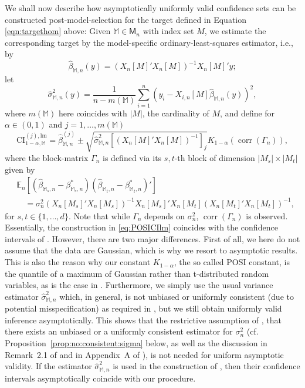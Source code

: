 \documentclass[preprint]{imsart}
\newcommand{\E}{{\mathbb E}}
\newcommand{\M}{\mathbb M}
\DeclareMathOperator{\corr}{corr}
\numberwithin{equation}{section}
\begin{document}
We shall now describe how asymptotically uniformly valid confidence sets can be constructed post-model-selection for the target defined in Equation \eqref{eqn:targethom} above: Given $\mathbb{M} \in \mathsf{M}_n$ with index set $M$, we estimate the corresponding target by the model-specific ordinary-least-squares estimator, i.e., by
%
\begin{equation}\label{eq:OLS}
\hat{\beta}_{\mathbb{M}, n}(y) = \left(X_n[M]'X_n[M]\right)^{-1} X_n[M]'y;
\end{equation}
%
let
%
\begin{equation*}
\hat{\sigma}^2_{\mathbb{M}, n}(y) = \frac{1}{n- m(\mathbb{M})} \sum_{i = 1}^n (y_i - X_{i,n}[M] \hat{\beta}_{\mathbb{M}, n}(y) )^2,
\end{equation*}
%
where $m(\mathbb{M})$ here coincides with $|M|$, the cardinality of $M$, and define for $\alpha \in (0, 1)$ and $j = 1, \hdots, m(\mathbb{M})$
%
\begin{equation}\label{eq:POSICIlm}
\mathrm{CI}_{1-\alpha, \mathbb{M}}^{(j), \mathrm{lm}} = \hat{\beta}^{(j)}_{\mathbb{M}, n} \pm  \sqrt{\hat{\sigma}^2_{\mathbb{M}, n} \left[\left( X_n[M]'X_n[M]  \right)^{-1}\right]_j} K_{1-\alpha}(\corr(\Gamma_n)), 
\end{equation}
%
where the block-matrix $\Gamma_n$ is defined via its $s,t$-th block of dimension $|M_s|\times|M_t|$ given by
%
\begin{align*}
&\E_n\left[ \left(\hat{\beta}_{\M_s,n} - \beta^*_{\M_s,n}\right) \left(\hat{\beta}_{\M_t,n} - \beta^*_{\M_t,n}\right)'  \right] \\
&\quad= \sigma_n^2\left( X_n[M_s]' X_n[M_s] \right)^{-1} X_n[M_s]' X_n[M_t] \left( X_n[M_t]' X_n[M_t] \right)^{-1}, 
\end{align*}
%
for $s, t \in \{1, \hdots, d\}$. Note that while $\Gamma_n$ depends on $\sigma_n^2$, $\corr(\Gamma_n)$ is observed. Essentially, the construction in \eqref{eq:POSICIlm} coincides with the confidence intervals of \citet{Berk13}. However, there are two major differences. First of all, we here do not assume that the data are Gaussian, which is why we resort to asymptotic results. This is also the reason why our constant $K_{1-\alpha}$, the so called POSI constant, is the quantile of a maximum of Gaussian rather than t-distributed random variables, as is the case in \citet{Berk13}. Furthermore, we simply use the usual variance estimator $\hat{\sigma}^2_{\mathbb{M}, n}$ which, in general, is not unbiased or uniformly consistent (due to potential misspecification) as required in \citet{Berk13}, but we still obtain uniformly valid inference asymptotically. This shows that the restrictive assumption of \citet{Berk13}, that there exists an unbiased or a uniformly consistent estimator for $\sigma_n^2$ (cf. Proposition~\ref{prop:no:consistent:sigma} below, as well as the discussion in Remark~2.1 of \cite{leeb13various} and in Appendix~A of \cite{bachoc14valid}), is not needed for uniform asymptotic validity. If the estimator $\hat{\sigma}^2_{\mathbb{M}, n}$ is used in the construction of \citet{Berk13}, then their confidence intervals asymptotically coincide with our procedure.
\end{document}
